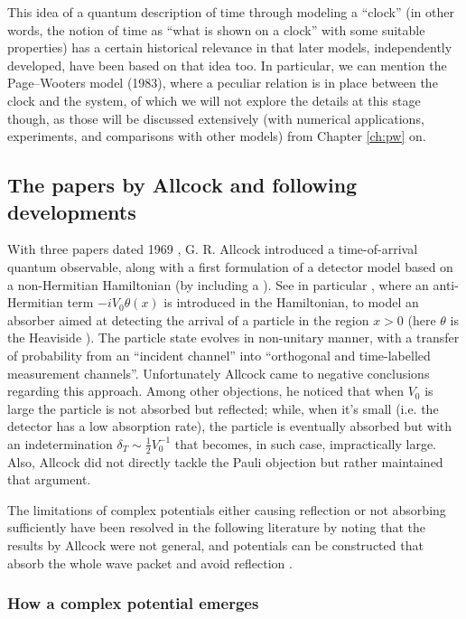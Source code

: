 This idea of a quantum description of time through modeling a ``clock''
(in other words, the notion of time as ``what is shown on a clock'' with some suitable properties)
has a certain historical relevance in that later models, independently developed,
have been based on that idea too.
In particular, we can mention
the Page--Wooters model (1983), where a peculiar relation is in place between the clock and the system,
of which we will not explore the details at this stage though,
as those will be discussed extensively (with numerical applications, experiments, and comparisons with other models)
from Chapter \ref{ch:pw} on.

\subsection{The papers by Allcock and following developments}

With three papers dated 1969 \parencite{Allcock-1, Allcock-2, Allcock-3}, G. R. Allcock
introduced a time-of-arrival quantum observable,
along with a first formulation of a detector model based on a non-Hermitian
Hamiltonian (by including a ).
See in particular \cite[sec.II-IV]{Allcock-2}, where an anti-Hermitian term
$-iV_0\theta(x)$ is introduced in the Hamiltonian,
to model an absorber aimed at detecting
the arrival of a particle in the region $x>0$
(here $\theta$ is the Heaviside ).
The particle state evolves
in non-unitary manner, with a transfer of probability
from an ``incident channel''
into ``orthogonal and time-labelled measurement channels''.
Unfortunately Allcock came to negative conclusions regarding this approach.
Among other objections, he noticed that when $V_0$ is large the particle is not absorbed but reflected;
while, when it's small (i.e. the detector has a low absorption rate), the particle is eventually absorbed but
with an indetermination $\delta_T \sim \frac{1}{2}V_{0}^{-1}$
that becomes, in such case, impractically large.
Also, Allcock did not directly tackle the Pauli objection
but rather maintained that argument.

The limitations of complex potentials either causing reflection
or not absorbing sufficiently have been resolved
in the following literature
by noting that the results by Allcock were not general, and
potentials can be constructed that absorb the whole wave packet
and avoid reflection \parencite{Muga_TOAQM, Muga_CompositeAbsPot, ComplexAbsPot}.

\subsubsection{How a complex potential emerges}

